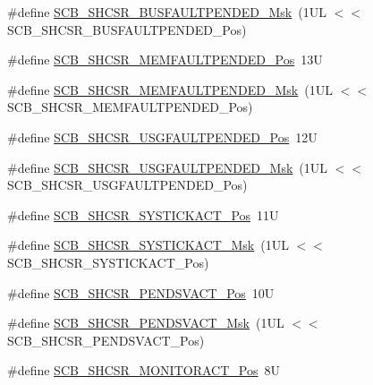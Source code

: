 \begin{DoxyCompactItemize}
\item 
\#define \hyperlink{group___c_m_s_i_s___s_c_b_ga677c23749c4d348f30fb471d1223e783}{S\-C\-B\-\_\-\-S\-H\-C\-S\-R\-\_\-\-B\-U\-S\-F\-A\-U\-L\-T\-P\-E\-N\-D\-E\-D\-\_\-\-Msk}~(1\-U\-L $<$$<$ S\-C\-B\-\_\-\-S\-H\-C\-S\-R\-\_\-\-B\-U\-S\-F\-A\-U\-L\-T\-P\-E\-N\-D\-E\-D\-\_\-\-Pos)
\item 
\#define \hyperlink{group___c_m_s_i_s___s_c_b_gaceb60fe2d8a8cb17fcd1c1f6b5aa924f}{S\-C\-B\-\_\-\-S\-H\-C\-S\-R\-\_\-\-M\-E\-M\-F\-A\-U\-L\-T\-P\-E\-N\-D\-E\-D\-\_\-\-Pos}~13\-U
\item 
\#define \hyperlink{group___c_m_s_i_s___s_c_b_ga9abc6c2e395f9e5af4ce05fc420fb04c}{S\-C\-B\-\_\-\-S\-H\-C\-S\-R\-\_\-\-M\-E\-M\-F\-A\-U\-L\-T\-P\-E\-N\-D\-E\-D\-\_\-\-Msk}~(1\-U\-L $<$$<$ S\-C\-B\-\_\-\-S\-H\-C\-S\-R\-\_\-\-M\-E\-M\-F\-A\-U\-L\-T\-P\-E\-N\-D\-E\-D\-\_\-\-Pos)
\item 
\#define \hyperlink{group___c_m_s_i_s___s_c_b_ga3cf03acf1fdc2edc3b047ddd47ebbf87}{S\-C\-B\-\_\-\-S\-H\-C\-S\-R\-\_\-\-U\-S\-G\-F\-A\-U\-L\-T\-P\-E\-N\-D\-E\-D\-\_\-\-Pos}~12\-U
\item 
\#define \hyperlink{group___c_m_s_i_s___s_c_b_ga122b4f732732010895e438803a29d3cc}{S\-C\-B\-\_\-\-S\-H\-C\-S\-R\-\_\-\-U\-S\-G\-F\-A\-U\-L\-T\-P\-E\-N\-D\-E\-D\-\_\-\-Msk}~(1\-U\-L $<$$<$ S\-C\-B\-\_\-\-S\-H\-C\-S\-R\-\_\-\-U\-S\-G\-F\-A\-U\-L\-T\-P\-E\-N\-D\-E\-D\-\_\-\-Pos)
\item 
\#define \hyperlink{group___c_m_s_i_s___s_c_b_gaec9ca3b1213c49e2442373445e1697de}{S\-C\-B\-\_\-\-S\-H\-C\-S\-R\-\_\-\-S\-Y\-S\-T\-I\-C\-K\-A\-C\-T\-\_\-\-Pos}~11\-U
\item 
\#define \hyperlink{group___c_m_s_i_s___s_c_b_gafef530088dc6d6bfc9f1893d52853684}{S\-C\-B\-\_\-\-S\-H\-C\-S\-R\-\_\-\-S\-Y\-S\-T\-I\-C\-K\-A\-C\-T\-\_\-\-Msk}~(1\-U\-L $<$$<$ S\-C\-B\-\_\-\-S\-H\-C\-S\-R\-\_\-\-S\-Y\-S\-T\-I\-C\-K\-A\-C\-T\-\_\-\-Pos)
\item 
\#define \hyperlink{group___c_m_s_i_s___s_c_b_ga9b9fa69ce4c5ce7fe0861dbccfb15939}{S\-C\-B\-\_\-\-S\-H\-C\-S\-R\-\_\-\-P\-E\-N\-D\-S\-V\-A\-C\-T\-\_\-\-Pos}~10\-U
\item 
\#define \hyperlink{group___c_m_s_i_s___s_c_b_gae0e837241a515d4cbadaaae1faa8e039}{S\-C\-B\-\_\-\-S\-H\-C\-S\-R\-\_\-\-P\-E\-N\-D\-S\-V\-A\-C\-T\-\_\-\-Msk}~(1\-U\-L $<$$<$ S\-C\-B\-\_\-\-S\-H\-C\-S\-R\-\_\-\-P\-E\-N\-D\-S\-V\-A\-C\-T\-\_\-\-Pos)
\item 
\#define \hyperlink{group___c_m_s_i_s___s_c_b_ga8b71cf4c61803752a41c96deb00d26af}{S\-C\-B\-\_\-\-S\-H\-C\-S\-R\-\_\-\-M\-O\-N\-I\-T\-O\-R\-A\-C\-T\-\_\-\-Pos}~8\-U
$$
\end{DoxyCompactItemize}
